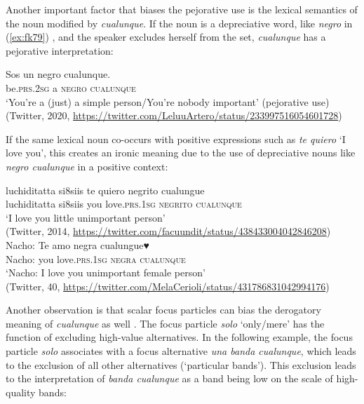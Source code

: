 \documentclass[output=paper,colorlinks,citecolor=brown]{langscibook}
\begin{document}
Another important factor that biases the pejorative use is the lexical semantics of the noun modified by \textit{cualunque}. If the noun is a depreciative word, like \textit{negro} in (\ref{ex:fk79}) \citep[see][]{Kellert2021b}, and the speaker excludes herself from the set, \textit{cualunque} has a pejorative interpretation:

\ea \label{ex:fk79}
    \gll Sos un negro cualunque.\\
    be.\textsc{prs.2sg} a \textsc{negro} \textsc{cualunque}\\
    \glt ‘You’re a (just) a simple person/You’re nobody important’ (pejorative use)\\
    (Twitter, 2020, \url{https://twitter.com/LeluuArtero/status/233997516054601728})\\
\z

If the same lexical noun co-occurs with positive expressions such as \textit{te quiero} ‘I love you’, this creates an ironic meaning due to the use of depreciative nouns like \textit{negro cualunque} in a positive context:

\ea \label{ex:fk80}
    \gll luchiditatta si8siis te quiero negrito cualungue\\
    luchiditatta si8siis you love.\textsc{prs.1sg} \textsc{negrito} \textsc{cualunque}\\
    \glt ‘I love you little unimportant person’\\
    (Twitter, 2014, \url{https://twitter.com/facuundit/status/438433004042846208})\\
    
    \ex \label{ex:fk81} 
    \gll Nacho: Te amo negra cualungue♥\\
    Nacho: you love.\textsc{prs.1sg} \textsc{negra} \textsc{cualunque}\\
    \glt ‘Nacho: I love you unimportant female person’\\
    (Twitter, 40, \url{https://twitter.com/MelaCerioli/status/431786831042994176})\\
\z

\begin{sloppypar}
Another observation is that scalar focus particles can bias the derogatory meaning of \textit{cualunque} as well \citep[see][]{Kellert2021c}. The focus particle \textit{solo} ‘only/mere’ has the function of excluding high-value alternatives. In the following example, the focus particle \textit{solo} associates with a focus alternative \textit{una banda cualunque}, which leads to the exclusion of all other alternatives (‘particular bands’). This exclusion leads to the interpretation of \textit{banda cualunque} as a band being low on the scale of high-quality bands:
\end{sloppypar}
\end{document}
